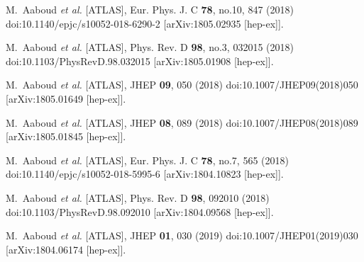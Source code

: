 \begin{thebibliography}{9}
M.~Aaboud \textit{et al.} [ATLAS],
Eur. Phys. J. C \textbf{78}, no.10, 847 (2018)
doi:10.1140/epjc/s10052-018-6290-2
[arXiv:1805.02935 [hep-ex]].

M.~Aaboud \textit{et al.} [ATLAS],
Phys. Rev. D \textbf{98}, no.3, 032015 (2018)
doi:10.1103/PhysRevD.98.032015
[arXiv:1805.01908 [hep-ex]].

M.~Aaboud \textit{et al.} [ATLAS],
JHEP \textbf{09}, 050 (2018)
doi:10.1007/JHEP09(2018)050
[arXiv:1805.01649 [hep-ex]].

M.~Aaboud \textit{et al.} [ATLAS],
JHEP \textbf{08}, 089 (2018)
doi:10.1007/JHEP08(2018)089
[arXiv:1805.01845 [hep-ex]].

M.~Aaboud \textit{et al.} [ATLAS],
Eur. Phys. J. C \textbf{78}, no.7, 565 (2018)
doi:10.1140/epjc/s10052-018-5995-6
[arXiv:1804.10823 [hep-ex]].

M.~Aaboud \textit{et al.} [ATLAS],
Phys. Rev. D \textbf{98}, 092010 (2018)
doi:10.1103/PhysRevD.98.092010
[arXiv:1804.09568 [hep-ex]].

M.~Aaboud \textit{et al.} [ATLAS],
JHEP \textbf{01}, 030 (2019)
doi:10.1007/JHEP01(2019)030
[arXiv:1804.06174 [hep-ex]].


\end{thebibliography}
